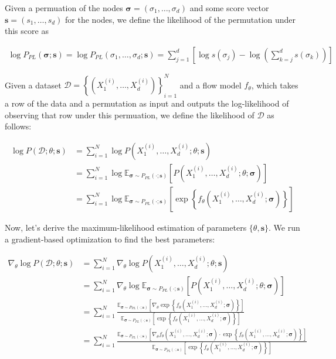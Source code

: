 \documentclass{article}
\begin{document}
Given a permuation of the nodes $\boldsymbol{\sigma} = \left(\sigma_1, \ldots, \sigma_d \right)$ and some score vector $\boldsymbol{s} = \left(s_1, \ldots, s_d\right)$ for the nodes, we define the likelihood of the permutation under this score as

\begin{align}
\log P_{PL}(\boldsymbol{\sigma}; \boldsymbol{s}) =\log P_{PL} \left({\sigma_1}, \ldots, {\sigma_d}; \boldsymbol{s}\right) =  \sum_{j = 1}^d \left[\log s({\sigma_j}) - \log \left( \sum_{k=j}^d s({\sigma_k}) \right)\right]
\end{align}

Given a dataset $\mathcal{D} = \left\{ \left(X^{(i)}_1, \ldots, X^{(i)}_d\right)\right\}_{i=1}^N$ and a flow model $f_\theta$, which takes a row of the data and a permutation as input and outputs the log-likelihood of observing that row under this permuation, we define the likelihood of $\mathcal{D}$ as follows:

\begin{align}
\log P(\mathcal{D};\theta; \boldsymbol{s}) &= \sum_{i=1}^N \log P(X^{(i)}_1, \ldots, X^{(i)}_d;\theta; \boldsymbol{s})\\
 &= \sum_{i=1}^N \log \mathbb{E}_{\boldsymbol{\sigma} \sim P_{PL}(\cdot; \boldsymbol{s})} \left[P(X^{(i)}_1, \ldots, X^{(i)}_d;\theta; \boldsymbol{\sigma})\right]\\
 & =\sum_{i=1}^N \log \mathbb{E}_{\boldsymbol{\sigma} \sim P_{PL}(\cdot; \boldsymbol{s})} \left[\exp \left\{ f_\theta\left(X^{(i)}_1, \ldots, X^{(i)}_d; \boldsymbol{\sigma}\right) \right\}\right]
\end{align}

Now, let's derive the maximum-likelihood estimation of parameters $\{\theta, \boldsymbol{s}\}$. We run a gradient-based optimization to find the best parameters:


\begin{align}
\nabla_{\theta} \log P(\mathcal{D};\theta; \boldsymbol{s}) &= \sum_{i=1}^N \nabla_{\theta} \log P(X^{(i)}_1, \ldots, X^{(i)}_d;\theta; \boldsymbol{s})\\
 &= \sum_{i=1}^N \nabla_{\theta} \log \mathbb{E}_{\boldsymbol{\sigma} \sim P_{PL}(\cdot; \boldsymbol{s})} \left[P(X^{(i)}_1, \ldots, X^{(i)}_d;\theta; \boldsymbol{\sigma})\right]\\
 & =\sum_{i=1}^N \frac{\mathbb{E}_{\boldsymbol{\sigma} \sim P_{PL}(\cdot; \boldsymbol{s})} \left[\nabla_{\theta} \exp \left\{ f_\theta\left(X^{(i)}_1, \ldots, X^{(i)}_d; \boldsymbol{\sigma}\right) \right\}\right]}{\mathbb{E}_{\boldsymbol{\sigma} \sim P_{PL}(\cdot; \boldsymbol{s})} \left[ \exp \left\{ f_\theta\left(X^{(i)}_1, \ldots, X^{(i)}_d; \boldsymbol{\sigma}\right) \right\}\right]} \\
  & =\sum_{i=1}^N \frac{\mathbb{E}_{\boldsymbol{\sigma} \sim P_{PL}(\cdot; \boldsymbol{s})} \left[\nabla_{\theta} f_\theta\left(X^{(i)}_1, \ldots, X^{(i)}_d; \boldsymbol{\sigma}\right) \cdot \exp \left\{ f_\theta\left(X^{(i)}_1, \ldots, X^{(i)}_d; \boldsymbol{\sigma}\right) \right\}\right]}{\mathbb{E}_{\boldsymbol{\sigma} \sim P_{PL}(\cdot; \boldsymbol{s})} \left[ \exp \left\{ f_\theta\left(X^{(i)}_1, \ldots, X^{(i)}_d; \boldsymbol{\sigma}\right) \right\}\right]}
\end{align}
\end{document}
